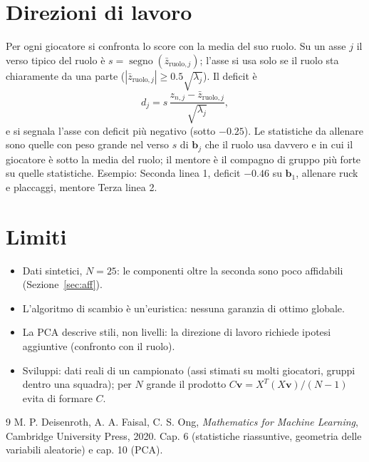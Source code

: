 \documentclass[11pt,a4paper]{article}
\theoremstyle{remark}
\newcommand{\bb}{\mathbf{b}}
\begin{document}
\section{Direzioni di lavoro}\label{sec:dir}
Per ogni giocatore si confronta lo score con la media del suo ruolo. Su un asse $j$ il verso tipico
del ruolo \`e $s=\operatorname{segno}(\bar z_{\text{ruolo},j})$; l'asse si usa solo se il ruolo sta
chiaramente da una parte ($|\bar z_{\text{ruolo},j}|\ge 0.5\sqrt{\lambda_j}$). Il deficit \`e
\[
d_j=s\,\frac{z_{n,j}-\bar z_{\text{ruolo},j}}{\sqrt{\lambda_j}} ,
\]
e si segnala l'asse con deficit pi\`u negativo (sotto $-0.25$). Le statistiche da allenare sono quelle
con peso grande nel verso $s$ di $\bb_j$ che il ruolo usa davvero e in cui il giocatore \`e sotto la media
del ruolo; il mentore \`e il compagno di gruppo pi\`u forte su quelle statistiche.
Esempio: Seconda linea 1, deficit $-0.46$ su $\bb_1$, allenare ruck e placcaggi, mentore Terza linea 2.

\section{Limiti}
\begin{itemize}
\item Dati sintetici, $N=25$: le componenti oltre la seconda sono poco affidabili (Sezione~\ref{sec:aff}).
\item L'algoritmo di scambio \`e un'euristica: nessuna garanzia di ottimo globale.
\item La PCA descrive stili, non livelli: la direzione di lavoro richiede ipotesi aggiuntive
(confronto con il ruolo).
\item Sviluppi: dati reali di un campionato (assi stimati su molti giocatori, gruppi dentro una squadra);
per $N$ grande il prodotto $C\mathbf v=X^T(X\mathbf v)/(N-1)$ evita di formare $C$.
\end{itemize}

\begin{thebibliography}{9}
 M. P. Deisenroth, A. A. Faisal, C. S. Ong, \emph{Mathematics for Machine Learning}, Cambridge University Press, 2020. Cap. 6 (statistiche riassuntive, geometria delle variabili aleatorie) e cap. 10 (PCA).
\end{thebibliography}
\end{document}
